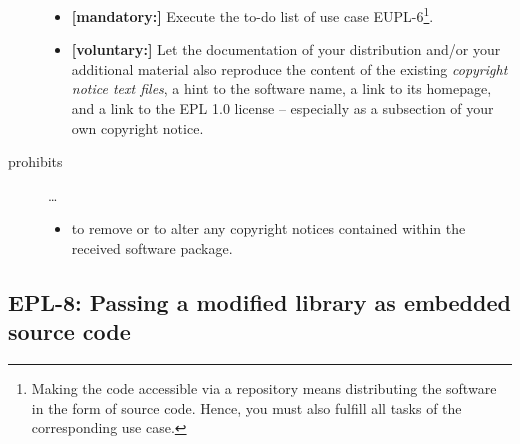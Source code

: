 \begin{description}
\begin{itemize}
  \item \textbf{[mandatory:]} Execute the to-do list of use case EUPL-6\footnote{
  Making the code accessible via a repository means distributing the software in
  the form of source code. Hence, you must also fulfill all tasks of the
  corresponding use case.}.
  
 
  \item \textbf{[voluntary:]} Let the documentation of your distribution and/or
  your additional material  also reproduce the content of the existing
  \emph{copyright notice text files}, a hint to the software name, a link to its
  homepage, and a link to the EPL 1.0 license -- especially as a subsection of
  your own copyright notice.
  
\end{itemize}

\item[prohibits] \ldots
\begin{itemize}
  \item to remove or to alter any copyright notices contained within the
  received software package.
\end{itemize}

\end{description}

\subsection{EPL-8: Passing a modified library as embedded source code}
\label{OSUC-10-EPL}

